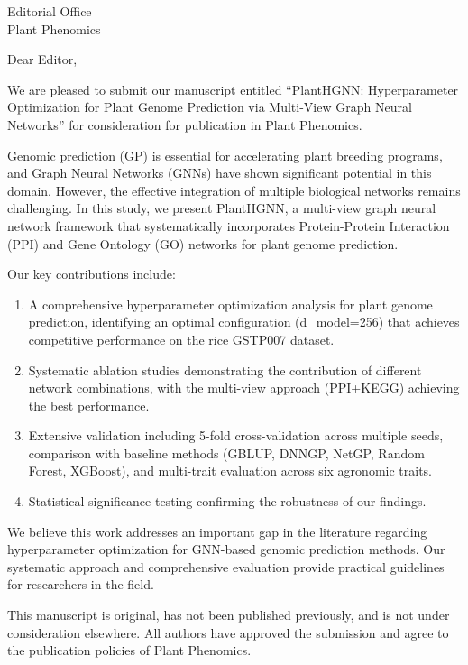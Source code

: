 \documentclass[11pt,a4paper]{letter}
\begin{document}
\begin{letter}{Editorial Office\\
Plant Phenomics\\
}

\opening{Dear Editor,}

We are pleased to submit our manuscript entitled ``PlantHGNN: Hyperparameter Optimization for Plant Genome Prediction via Multi-View Graph Neural Networks'' for consideration for publication in Plant Phenomics.

Genomic prediction (GP) is essential for accelerating plant breeding programs, and Graph Neural Networks (GNNs) have shown significant potential in this domain. However, the effective integration of multiple biological networks remains challenging. In this study, we present PlantHGNN, a multi-view graph neural network framework that systematically incorporates Protein-Protein Interaction (PPI) and Gene Ontology (GO) networks for plant genome prediction.

Our key contributions include:

\begin{enumerate}
    \item A comprehensive hyperparameter optimization analysis for plant genome prediction, identifying an optimal configuration (d\_model=256) that achieves competitive performance on the rice GSTP007 dataset.

    \item Systematic ablation studies demonstrating the contribution of different network combinations, with the multi-view approach (PPI+KEGG) achieving the best performance.

    \item Extensive validation including 5-fold cross-validation across multiple seeds, comparison with baseline methods (GBLUP, DNNGP, NetGP, Random Forest, XGBoost), and multi-trait evaluation across six agronomic traits.

    \item Statistical significance testing confirming the robustness of our findings.
\end{enumerate}

We believe this work addresses an important gap in the literature regarding hyperparameter optimization for GNN-based genomic prediction methods. Our systematic approach and comprehensive evaluation provide practical guidelines for researchers in the field.

This manuscript is original, has not been published previously, and is not under consideration elsewhere. All authors have approved the submission and agree to the publication policies of Plant Phenomics.


\end{letter}
\end{document}
